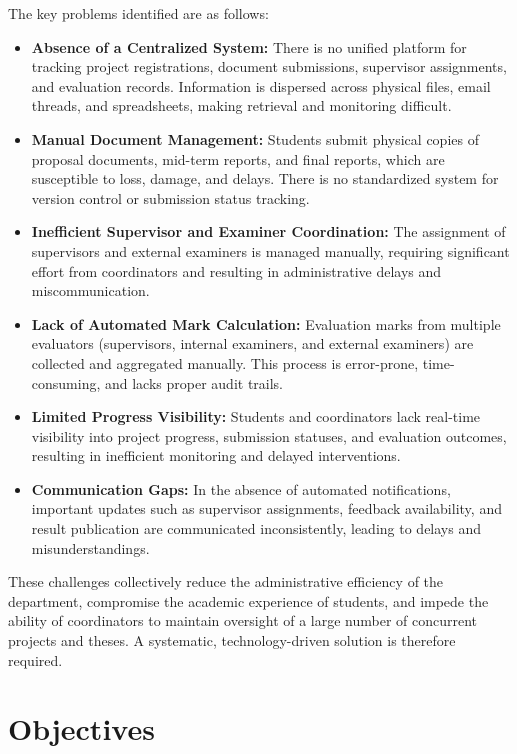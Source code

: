 \documentclass[12pt,a4paper]{report}
\begin{document}
The key problems identified are as follows:
\begin{itemize}
  \item \textbf{Absence of a Centralized System:} There is no unified platform for tracking project registrations, document submissions, supervisor assignments, and evaluation records. Information is dispersed across physical files, email threads, and spreadsheets, making retrieval and monitoring difficult.
  
  \item \textbf{Manual Document Management:} Students submit physical copies of proposal documents, mid-term reports, and final reports, which are susceptible to loss, damage, and delays. There is no standardized system for version control or submission status tracking.
  
  \item \textbf{Inefficient Supervisor and Examiner Coordination:} The assignment of supervisors and external examiners is managed manually, requiring significant effort from coordinators and resulting in administrative delays and miscommunication.
  
  \item \textbf{Lack of Automated Mark Calculation:} Evaluation marks from multiple evaluators (supervisors, internal examiners, and external examiners) are collected and aggregated manually. This process is error-prone, time-consuming, and lacks proper audit trails.
  
  \item \textbf{Limited Progress Visibility:} Students and coordinators lack real-time visibility into project progress, submission statuses, and evaluation outcomes, resulting in inefficient monitoring and delayed interventions.
  
  \item \textbf{Communication Gaps:} In the absence of automated notifications, important updates such as supervisor assignments, feedback availability, and result publication are communicated inconsistently, leading to delays and misunderstandings.
\end{itemize}

These challenges collectively reduce the administrative efficiency of the department, compromise the academic experience of students, and impede the ability of coordinators to maintain oversight of a large number of concurrent projects and theses. A systematic, technology-driven solution is therefore required.

\section{Objectives}
\end{document}
